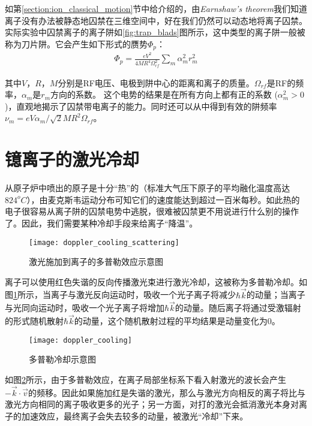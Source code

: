 如第\ref{section:ion_classical_motion}节中给介绍的，由\emph{Earnshaw's theorem}\cite[]{Earnshaw}我们知道离子没有办法被静态地囚禁在三维空间中，好在我们仍然可以动态地将离子囚禁。实际实验中囚禁离子的离子阱如\ref{fig:trap_blads}图所示，这中类型的离子阱一般被称为刀片阱。它会产生如下形式的赝势$\Phi_p$：
\begin{align}
    \Phi_p=\frac{eV^2}{4MR^4\Omega_{rf}^2}\sum_{m}^{}\alpha_m^2r_m^2
\end{align}

其中$V$，$R$，$M$分别是RF电压、电极到阱中心的距离和离子的质量。$\Omega_{rf}$是RF的频率，$\alpha_m$是$r_m$方向的系数。
这个电势的结果是在所有方向上都有正的系数 ($\alpha_m^2>0$)，直观地揭示了囚禁带电离子的能力。同时还可以从中得到有效的阱频率$\nu_m=eV\alpha_m/\sqrt{2}MR^2\Omega_{rf}$。

\section[镱离子的激光冷却]{镱离子的激光冷却\label{section:yb_laser_cooling}}
从原子炉中喷出的原子是十分“热”的（标准大气压下原子的平均融化温度高达$824 ^o C$），由麦克斯韦运动分布可知它们的速度能达到超过一百米每秒。如此热的电子很容易从离子阱的囚禁电势中逃脱，很难被囚禁更不用说进行什么别的操作了。因此，我们需要某种冷却手段来给离子“降温”。

\begin{figure}
    \centering
    \caption[激光施加到离子的多普勒效应示意图]{激光施加到离子的多普勒效应示意图\label{fig:doppler_cooling_scattering}}
    \texttt{[image: doppler\_cooling\_scattering]}
\end{figure}
离子可以使用红色失谐的反向传播激光束进行激光冷却，这被称为多普勒冷却\cite[]{Hänsch_Schawlow_1975}。如图\ref{fig:doppler_cooling_scattering}所示，当离子与激光反向运动时，吸收一个光子离子将减少$\hbar \vec{k}$的动量；当离子与光同向运动时，吸收一个光子离子将增加$\hbar \vec{k}$的动量。随后离子将通过受激辐射的形式随机散射$\hbar \vec{k}$的动量，这个随机散射过程的平均结果是动量变化为$0$。

\begin{figure}
    \centering
    \caption[多普勒冷却示意图]{多普勒冷却示意图\label{fig:doppler_cooling}}
    \texttt{[image: doppler\_cooling]}
\end{figure}
如图\ref{fig:doppler_cooling}所示，由于多普勒效应，在离子局部坐标系下看入射激光的波长会产生$-\vec{k}\cdot\vec{v}$的频移。因此如果施加红是失谐的激光，那么与激光方向相反的离子将比与激光方向相同的离子吸收更多的光子；另一方面，对打的激光会抵消激光本身对离子的加速效应，最终离子会失去较多的动量，被激光“冷却”下来。

